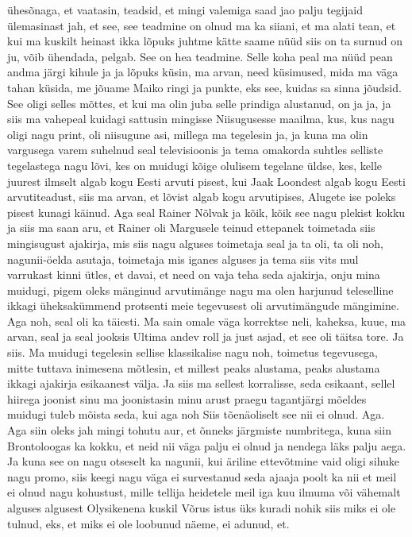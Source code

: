 ühesõnaga, et vaatasin, teadsid, et mingi valemiga saad jao palju tegijaid ülemasinast jah, et see, see teadmine on olnud ma ka siiani, et ma alati tean, et kui ma kuskilt heinast ikka lõpuks juhtme kätte saame nüüd siis on ta surnud on ju, võib ühendada, pelgab.
See on hea teadmine. Selle koha peal ma nüüd pean andma järgi kihule ja ja lõpuks küsin, ma arvan, need küsimused, mida ma väga tahan küsida, me jõuame Maiko ringi ja punkte, eks see, kuidas sa sinna jõudsid. See oligi selles mõttes, et kui ma olin juba selle prindiga alustanud, on ja ja, ja siis ma vahepeal kuidagi sattusin mingisse
Niisugusesse maailma, kus, kus nagu oligi nagu print, oli niisugune asi, millega ma tegelesin ja, ja kuna ma olin vargusega varem suhelnud seal televisioonis ja tema omakorda suhtles selliste tegelastega nagu lõvi, kes on muidugi kõige olulisem tegelane üldse, kes, kelle juurest ilmselt algab kogu Eesti arvuti pisest, kui Jaak Loondest algab kogu Eesti arvutiteadust, siis ma arvan, et lõvist algab kogu arvutipises, Alugete ise poleks pisest kunagi käinud. Aga seal Rainer Nõlvak ja kõik, kõik see nagu plekist kokku ja siis ma saan aru, et Rainer oli Margusele teinud ettepanek toimetada siis mingisugust ajakirja, mis siis nagu alguses toimetaja seal ja ta oli, ta oli noh, nagunii-öelda asutaja, toimetaja mis iganes alguses ja tema siis vits mul varrukast kinni ütles, et davai, et need on vaja teha seda ajakirja, onju mina muidugi, pigem oleks mänginud arvutimänge nagu ma olen harjunud teleselline ikkagi üheksakümmend protsenti meie tegevusest oli arvutimängude mängimine. Aga noh, seal oli ka täiesti. Ma sain omale väga korrektse neli, kaheksa, kuue, ma arvan, seal ja seal jooksis Ultima andev roll ja just asjad, et see oli täitsa tore. Ja siis.
Ma muidugi tegelesin sellise klassikalise nagu noh, toimetus tegevusega, mitte tuttava inimesena mõtlesin, et millest peaks alustama, peaks alustama ikkagi ajakirja esikaanest välja. Ja siis ma sellest korralisse, seda esikaant, sellel hiirega joonist sinu ma joonistasin minu arust praegu tagantjärgi mõeldes muidugi tuleb mõista seda, kui aga noh
Siis tõenäoliselt see nii ei olnud. Aga.
Aga siin oleks jah mingi tohutu aur, et õnneks järgmiste numbritega, kuna siin Brontoloogas ka kokku, et neid nii väga palju ei olnud ja nendega läks palju aega. Ja kuna see on nagu otseselt ka nagunii, kui äriline ettevõtmine vaid oligi sihuke nagu promo, siis keegi nagu väga ei survestanud seda ajaaja poolt ka nii et meil ei olnud nagu kohustust, mille tellija heidetele meil iga kuu ilmuma või vähemalt alguses algusest Olysikenena kuskil Võrus istus üks kuradi nohik siis miks ei ole tulnud, eks, et miks ei ole loobunud näeme, ei adunud, et.
